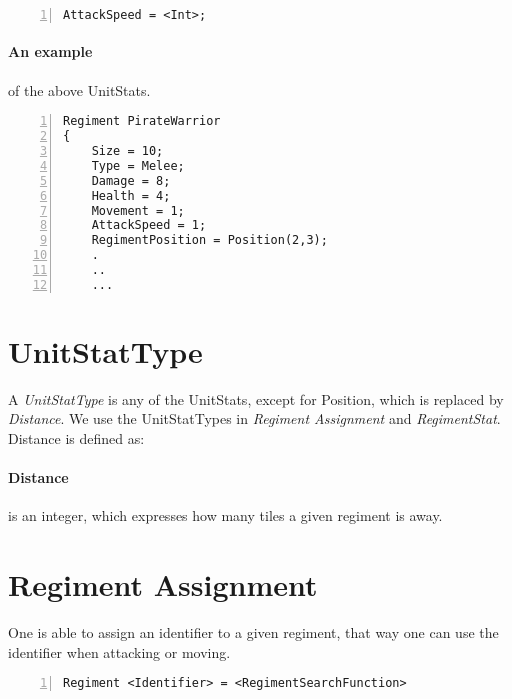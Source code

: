 		\begin{lstlisting}[basicstyle=\small\sffamily,
		keywordstyle={\color{blue}},
		comment={[l]{//}}, morecomment={[s]{/*}{*/}}, commentstyle=\itshape,
		columns={[l]flexible}, numbers=left, numberstyle=\tiny,
		frameround=fftt, frame=shadowbox, captionpos=b,
		caption={AttackSpeed of the regiment}]
AttackSpeed = <Int>;
			\end{lstlisting}
			
\paragraph{An example} of the above UnitStats.
		\begin{lstlisting}[basicstyle=\small\sffamily,
		keywordstyle={\color{blue}},
		comment={[l]{//}}, morecomment={[s]{/*}{*/}}, commentstyle=\itshape,
		columns={[l]flexible}, numbers=left, numberstyle=\tiny,
		frameround=fftt, frame=shadowbox, captionpos=b,
		caption={Example: Using the UnitStats}]
Regiment PirateWarrior
{
	Size = 10;
	Type = Melee;
	Damage = 8;
	Health = 4;
	Movement = 1;
	AttackSpeed = 1;
	RegimentPosition = Position(2,3);
	.
	..
	...
\end{lstlisting}
			

\section{UnitStatType}
	A {\it UnitStatType} is any of the UnitStats, except for Position, which is replaced by {\it Distance}. We use the UnitStatTypes in 
	{\it Regiment Assignment} and {\it RegimentStat}.
	Distance is defined as:
	\paragraph{Distance} is an integer, which expresses how many tiles a given regiment is away.

\section{Regiment Assignment}
\label{doc:regass}
	One is able to assign an identifier to a given regiment, that way one can use the identifier when attacking or moving.
	
		\begin{lstlisting}[basicstyle=\small\sffamily, keywordstyle={\color{blue}}, comment={[l]{//}}, morecomment={[s]{/*}{*/}}, commentstyle=\itshape, columns={[l]flexible}, numbers=left, numberstyle=\tiny, frameround=fftt, frame=shadowbox, captionpos=b,
		caption={Regiment Assignment}]
Regiment <Identifier> = <RegimentSearchFunction>			
		\end{lstlisting}	


